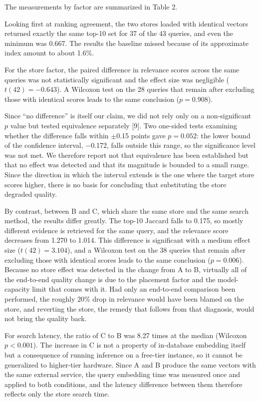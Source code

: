 \documentclass[10pt,a4paper,twocolumn]{article}
\begin{document}
The measurements by factor are summarized in Table 2.

Looking first at ranking agreement, the two stores loaded with identical vectors returned exactly the same top-10 set for 37 of the 43 queries, and even the minimum was 0.667. The results the baseline missed because of its approximate index amount to about 1.6\%.

For the store factor, the paired difference in relevance scores across the same queries was not statistically significant and the effect size was negligible ($t(42) = -0.643$). A Wilcoxon test on the 28 queries that remain after excluding those with identical scores leads to the same conclusion ($p = 0.908$).

Since ``no difference'' is itself our claim, we did not rely only on a non-significant $p$ value but tested equivalence separately [9]. Two one-sided tests examining whether the difference falls within $\pm$0.15 points gave $p = 0.052$: the lower bound of the confidence interval, $-$0.172, falls outside this range, so the significance level was not met. We therefore report not that equivalence has been established but that no effect was detected and that its magnitude is bounded to a small range. Since the direction in which the interval extends is the one where the target store scores higher, there is no basis for concluding that substituting the store degraded quality.

By contrast, between B and C, which share the same store and the same search method, the results differ greatly. The top-10 Jaccard falls to 0.175, so mostly different evidence is retrieved for the same query, and the relevance score decreases from 1.270 to 1.014. This difference is significant with a medium effect size ($t(42) = 3.104$), and a Wilcoxon test on the 38 queries that remain after excluding those with identical scores leads to the same conclusion ($p = 0.006$). Because no store effect was detected in the change from A to B, virtually all of the end-to-end quality change is due to the placement factor and the model-capacity limit that comes with it. Had only an end-to-end comparison been performed, the roughly 20\% drop in relevance would have been blamed on the store, and reverting the store, the remedy that follows from that diagnosis, would not bring the quality back.

For search latency, the ratio of C to B was 8.27 times at the median (Wilcoxon $p < 0.001$). The increase in C is not a property of in-database embedding itself but a consequence of running inference on a free-tier instance, so it cannot be generalized to higher-tier hardware. Since A and B produce the same vectors with the same external service, the query embedding time was measured once and applied to both conditions, and the latency difference between them therefore reflects only the store search time.
\end{document}
